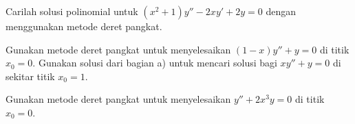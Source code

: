 \begin{exercise}
Carilah solusi polinomial untuk $(x^2+1) y''-2xy'+2y = 0$ dengan menggunakan
metode deret pangkat.
\end{exercise}

\begin{exercise}
\leavevmode
\begin{tasks}
\task Gunakan metode deret pangkat untuk menyelesaikan $(1-x)y''+y = 0$ di titik $x_0 = 0$.
\task Gunakan solusi dari bagian a) untuk mencari solusi
bagi $xy''+y=0$ di sekitar titik $x_0=1$.
\end{tasks}
\end{exercise}

\setcounter{exercise}{100}

\begin{exercise}
Gunakan metode deret pangkat untuk menyelesaikan $y'' + 2 x^3 y = 0$ di titik $x_0 =
0$.
\end{exercise}

